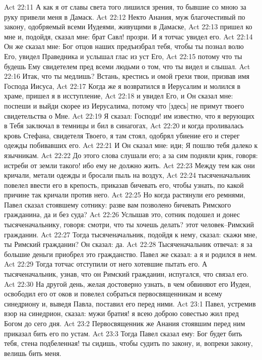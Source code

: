 Act 22:11  А как я от славы света того лишился зрения, то бывшие со мною за руку привели меня в Дамаск.
Act 22:12  Некто Анания, муж благочестивый по закону, одобряемый всеми Иудеями, живущими в Дамаске,
Act 22:13  пришел ко мне и, подойдя, сказал мне: брат Савл! прозри. И я тотчас увидел его.
Act 22:14  Он же сказал мне: Бог отцов наших предъизбрал тебя, чтобы ты познал волю Его, увидел Праведника и услышал глас из уст Его,
Act 22:15  потому что ты будешь Ему свидетелем пред всеми людьми о том, что ты видел и слышал.
Act 22:16  Итак, что ты медлишь? Встань, крестись и омой грехи твои, призвав имя Господа Иисуса,
Act 22:17  Когда же я возвратился в Иерусалим и молился в храме, пришел я в исступление,
Act 22:18  и увидел Его, и Он сказал мне: поспеши и выйди скорее из Иерусалима, потому что [здесь] не примут твоего свидетельства о Мне.
Act 22:19  Я сказал: Господи! им известно, что я верующих в Тебя заключал в темницы и бил в синагогах,
Act 22:20  и когда проливалась кровь Стефана, свидетеля Твоего, я там стоял, одобрял убиение его и стерег одежды побивавших его.
Act 22:21  И Он сказал мне: иди; Я пошлю тебя далеко к язычникам.
Act 22:22  До этого слова слушали его; а за сим подняли крик, говоря: истреби от земли такого! ибо ему не должно жить.
Act 22:23  Между тем как они кричали, метали одежды и бросали пыль на воздух,
Act 22:24  тысяченачальник повелел ввести его в крепость, приказав бичевать его, чтобы узнать, по какой причине так кричали против него.
Act 22:25  Но когда растянули его ремнями, Павел сказал стоявшему сотнику: разве вам позволено бичевать Римского гражданина, да и без суда?
Act 22:26  Услышав это, сотник подошел и донес тысяченачальнику, говоря: смотри, что ты хочешь делать? этот человек--Римский гражданин.
Act 22:27  Тогда тысяченачальник, подойдя к нему, сказал: скажи мне, ты Римский гражданин? Он сказал: да.
Act 22:28  Тысяченачальник отвечал: я за большие деньги приобрел это гражданство. Павел же сказал: а я и родился в нем.
Act 22:29  Тогда тотчас отступили от него хотевшие пытать его. А тысяченачальник, узнав, что он Римский гражданин, испугался, что связал его.
Act 22:30  На другой день, желая достоверно узнать, в чем обвиняют его Иудеи, освободил его от оков и повелел собраться первосвященникам и всему синедриону и, выведя Павла, поставил его перед ними.
Act 23:1  Павел, устремив взор на синедрион, сказал: мужи братия! я всею доброю совестью жил пред Богом до сего дня.
Act 23:2  Первосвященник же Анания стоявшим перед ним приказал бить его по устам.
Act 23:3  Тогда Павел сказал ему: Бог будет бить тебя, стена подбеленная! ты сидишь, чтобы судить по закону, и, вопреки закону, велишь бить меня.
